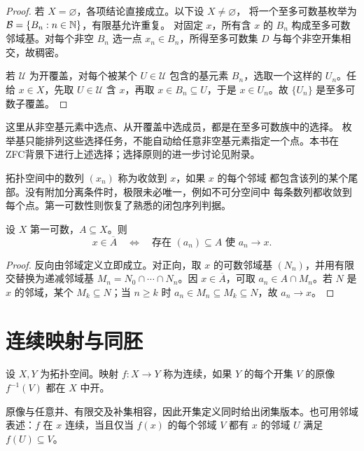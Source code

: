\begin{proof}
若 \(X=\varnothing\)，各项结论直接成立。以下设 \(X\ne\varnothing\)，
将一个至多可数基枚举为 \(\mathcal B=\{B_n:n\in\mathbb{N}\}\)，有限基允许重复。
对固定 \(x\)，所有含 \(x\) 的 \(B_n\) 构成至多可数邻域基。对每个非空
\(B_n\) 选一点 \(x_n\in B_n\)，所得至多可数集 \(D\) 与每个非空开集相交，故稠密。

若 \(\mathcal U\) 为开覆盖，对每个被某个 \(U\in\mathcal U\) 包含的基元素 \(B_n\)，选取一个这样的 \(U_n\)。任给 \(x\in X\)，先取 \(U\in\mathcal U\) 含 \(x\)，再取 \(x\in B_n\subseteq U\)，于是 \(x\in U_n\)。故 \(\{U_n\}\) 是至多可数子覆盖。
\end{proof}

这里从非空基元素中选点、从开覆盖中选成员，都是在至多可数族中的选择。
枚举基只能排列这些选择任务，不能自动给任意非空基元素指定一个点。本书在
ZFC背景下进行上述选择；选择原则的进一步讨论见附录。

拓扑空间中的数列 \((x_n)\) 称为收敛到 \(x\)，如果 \(x\) 的每个邻域
都包含该列的某个尾部。没有附加分离条件时，极限未必唯一，例如不可分空间中
每条数列都收敛到每个点。第一可数性则恢复了熟悉的闭包序列判据。

\begin{theorem}[第一可数空间中的闭包]
\label{thm:first-countable-sequential-closure}
设 \(X\) 第一可数，\(A\subseteq X\)。则
\[
 x\in\overline A
 \quad\Longleftrightarrow\quad
 \text{存在 }(a_n)\subseteq A\text{ 使 }a_n\to x.
\]
\end{theorem}

\begin{proof}
反向由邻域定义立即成立。对正向，取 \(x\) 的可数邻域基 \((N_n)\)，并用有限交替换为递减邻域基
\(M_n=N_0\cap\cdots\cap N_n\)。因 \(x\in\overline A\)，可取 \(a_n\in A\cap M_n\)。若 \(N\) 是 \(x\) 的邻域，某个 \(M_k\subseteq N\)；当 \(n\ge k\) 时 \(a_n\in M_n\subseteq M_k\subseteq N\)，故 \(a_n\to x\)。
\end{proof}

\section{连续映射与同胚}

\begin{definition}[连续映射]
设 \(X,Y\) 为拓扑空间。映射 \(f:X\to Y\) 称为连续，如果 \(Y\) 的每个开集 \(V\) 的原像 \(f^{-1}(V)\) 都在 \(X\) 中开。
\end{definition}

原像与任意并、有限交及补集相容，因此开集定义同时给出闭集版本。也可用邻域表述：\(f\) 在 \(x\) 连续，当且仅当 \(f(x)\) 的每个邻域 \(V\) 都有 \(x\) 的邻域 \(U\) 满足 \(f(U)\subseteq V\)。

